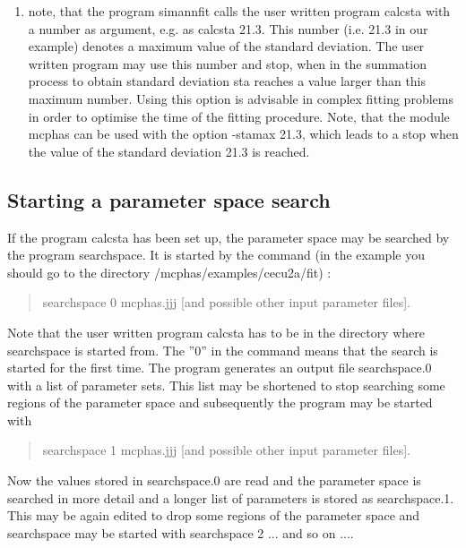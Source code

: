 \begin{enumerate}
to the squared error of the fitting parameters par$_j$ and the off diagonal elements to
the correlation among these fitting parameters.  Useful to generate
the required {\em sta= ...} statements is the program {\prg chi2}.
\item
 note, that the program {\prg simannfit} calls the user written program
{\prg calcsta} with a number as argument, e.g. as {\prg calcsta 21.3}. This number
(i.e. 21.3 in our example) denotes a maximum value of the standard deviation. The
user written program may use this number and stop, when in the summation process
to obtain standard deviation {\prg sta} reaches a value larger than this maximum
number. Using this option is advisable in complex fitting problems in order to
optimise the time of the fitting procedure. Note, that the module {\prg mcphas}
can be used with the option {\prg -stamax 21.3}, which leads to a stop when the value of 
the standard deviation 21.3 is reached. 
\end{enumerate}

\subsection{Starting a parameter space search}

If the program {\prg calcsta} has been set up, the parameter space may be
searched by the program {\prg searchspace}. It is started
by the command (in the example you should go to the directory {\prg /mcphas/examples/cecu2a/fit}) 
:

\begin{quote}
 {\prg searchspace 0 mcphas.jjj [and possible other input parameter files]}.
\end{quote}


Note that the user written program {\prg calcsta} has to be in the
directory where {\prg searchspace} is started from.
The ''0'' in the command means that the search is started for the first time.
The program generates an output file {\prg searchspace.0} with a list
of parameter sets. This list may be shortened to stop searching 
some regions of the parameter space and subsequently the program may be started
with

\begin{quote}
 {\prg searchspace 1 mcphas.jjj [and possible other input parameter files]}.
\end{quote}


Now the values stored in {\prg searchspace.0} are read and 
the parameter space is searched in more detail and a longer list 
of parameters is stored as {\prg searchspace.1}. This may be again
edited to drop some regions of the parameter space and {\prg searchspace}
may be started with {\prg searchspace 2 ...} and so on ....

